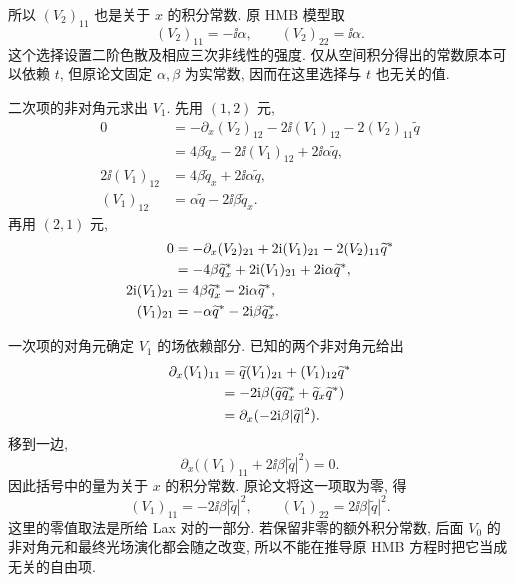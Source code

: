 所以 $(V_2)_{11}$ 也是关于 $x$ 的积分常数. 原 HMB 模型取
\begin{equation*}
(V_2)_{11}=-\ii\alpha,
\qquad
(V_2)_{22}=\ii\alpha.
\end{equation*}
这个选择设置二阶色散及相应三次非线性的强度. 仅从空间积分得出的常数原本可以依赖 $t$, 但原论文固定 $\alpha,\beta$ 为实常数, 因而在这里选择与 $t$ 也无关的值.
\par\smallskip\noindent 二次项的非对角元求出 $V_1$.\quad
先用 $(1,2)$ 元,
\begin{align*}
0&=-\partial_x(V_2)_{12}
-2\ii(V_1)_{12}-2(V_2)_{11}\widetilde q\\
&=4\beta\widetilde q_x
-2\ii(V_1)_{12}+2\ii\alpha\widetilde q,\\
2\ii(V_1)_{12}
&=4\beta\widetilde q_x+2\ii\alpha\widetilde q,\\
(V_1)_{12}
&=\alpha\widetilde q-2\ii\beta\widetilde q_x.
\end{align*}
再用 $(2,1)$ 元,
\begin{align*}
0&=-\partial_x(V_2)_{21}
+2\mathrm{i}(V_1)_{21}-2(V_2)_{11}{\widetilde q}^{*}\\
&=-4\beta{\widetilde q_x}^{*}
+2\mathrm{i}(V_1)_{21}+2\mathrm{i}\alpha{\widetilde q}^{*},\\
2\mathrm{i}(V_1)_{21}
&=4\beta{\widetilde q_x}^{*}-2\mathrm{i}\alpha{\widetilde q}^{*},\\
(V_1)_{21}
&=-\alpha{\widetilde q}^{*}
-2\mathrm{i}\beta{\widetilde q_x}^{*}.
\end{align*}
\par\smallskip\noindent 一次项的对角元确定 $V_1$ 的场依赖部分.\quad
已知的两个非对角元给出
\begin{align*}
\partial_x(V_1)_{11}
&=\widetilde q(V_1)_{21}
+(V_1)_{12}{\widetilde q}^{*}\\
&=-2\mathrm{i}\beta
(\widetilde q{\widetilde q_x}^{*}
+\widetilde q_x{\widetilde q}^{*})\\
&=\partial_x(-2\mathrm{i}\beta|\widetilde q|^2).
\end{align*}
移到一边,
\begin{equation*}
\partial_x\bigl((V_1)_{11}+2\ii\beta|\widetilde q|^2\bigr)=0.
\end{equation*}
因此括号中的量为关于 $x$ 的积分常数. 原论文将这一项取为零, 得
\begin{equation*}
(V_1)_{11}=-2\ii\beta|\widetilde q|^2,
\qquad
(V_1)_{22}=2\ii\beta|\widetilde q|^2.
\end{equation*}
这里的零值取法是所给 Lax 对的一部分. 若保留非零的额外积分常数, 后面 $V_0$ 的非对角元和最终光场演化都会随之改变, 所以不能在推导原 HMB 方程时把它当成无关的自由项.

